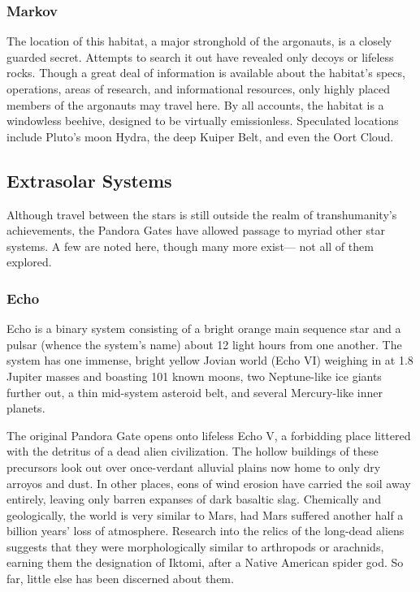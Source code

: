 \subsubsection{Markov}

The location of this habitat, a major stronghold of 
the argonauts, is a closely guarded secret. Attempts to 
search it out have revealed only decoys or lifeless rocks. 
Though a great deal of information is available about 
the habitat's specs, operations, areas of research, and 
informational resources, only highly placed members 
of the argonauts may travel here. By all accounts, the 
habitat is a windowless beehive, designed to be virtually 
emissionless. Speculated locations include Pluto's moon 
Hydra, the deep Kuiper Belt, and even the Oort Cloud.

\subsection{Extrasolar Systems}

Although travel between the stars is still outside the 
realm of transhumanity's achievements, the Pandora 
Gates have allowed passage to myriad other star systems. A few are noted here, though many more exist—
not all of them explored.

\subsubsection{Echo}

Echo is a binary system consisting of a bright orange 
main sequence star and a pulsar (whence the system's 
name) about 12 light hours from one another. The 
system has one immense, bright yellow Jovian world 
(Echo VI) weighing in at 1.8 Jupiter masses and boasting 101 known moons, two Neptune-like ice giants 
further out, a thin mid-system asteroid belt, and several 
Mercury-like inner planets.

The original Pandora Gate opens onto lifeless Echo V, a forbidding place littered with the detritus of a dead alien civilization. The 
hollow buildings of these precursors look out over once-verdant 
alluvial plains now home to only dry arroyos and dust. In other 
places, eons of wind erosion have carried the soil away entirely, 
leaving only barren expanses of dark basaltic slag. Chemically and 
geologically, the world is very similar to Mars, had Mars suffered 
another half a billion years' loss of atmosphere. Research into the 
relics of the long-dead aliens suggests that they were morphologically similar to arthropods or arachnids, earning them the designation of Iktomi, after a Native American spider god. So far, little else 
has been discerned about them.

